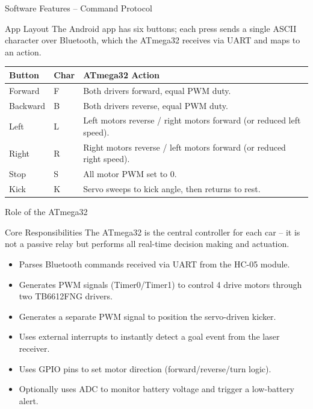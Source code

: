 \documentclass[aspectratio=169]{beamer}
\begin{document}
\begin{frame}{Software Features -- Command Protocol}
  \begin{block}{App Layout}
    The Android app has six buttons; each press sends a single ASCII character
    over Bluetooth, which the ATmega32 receives via UART and maps to an action.
  \end{block}
  \small
  \begin{tabular}{@{}p{2.3cm}p{1.2cm}p{7.5cm}@{}}
    \toprule
    \textbf{Button} & \textbf{Char} & \textbf{ATmega32 Action} \\
    \midrule
    Forward  & F & Both drivers forward, equal PWM duty. \\
    Backward & B & Both drivers reverse, equal PWM duty. \\
    Left     & L & Left motors reverse / right motors forward (or reduced left speed). \\
    Right    & R & Right motors reverse / left motors forward (or reduced right speed). \\
    Stop     & S & All motor PWM set to 0. \\
    Kick     & K & Servo sweeps to kick angle, then returns to rest. \\
    \bottomrule
  \end{tabular}
\end{frame}

\begin{frame}{Role of the ATmega32}
  \begin{block}{Core Responsibilities}
    The ATmega32 is the central controller for each car -- it is not a passive
    relay but performs all real-time decision making and actuation.
  \end{block}
  \begin{itemize}
    \item Parses Bluetooth commands received via UART from the HC-05 module.
    \item Generates PWM signals (Timer0/Timer1) to control 4 drive motors through two TB6612FNG drivers.
    \item Generates a separate PWM signal to position the servo-driven kicker.
    \item Uses external interrupts to instantly detect a goal event from the laser receiver.
    \item Uses GPIO pins to set motor direction (forward/reverse/turn logic).
    \item Optionally uses ADC to monitor battery voltage and trigger a low-battery alert.
  \end{itemize}
\end{frame}
\end{document}
